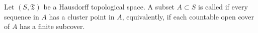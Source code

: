 Let $(S, \mathfrak{T})$ be a Hausdorff topological space. A subset $A \subset S$ is called  if every sequence in $A$ has a cluster point in $A$, equivalently, if each countable open cover of $A$ has a finite subcover.
